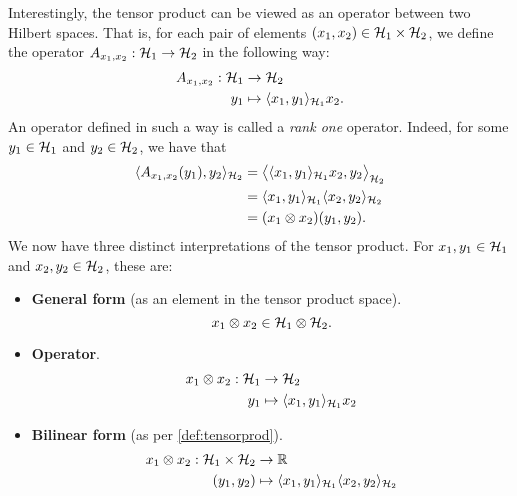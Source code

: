 Interestingly, the tensor product can be viewed as an operator between two Hilbert spaces.
That is, for each pair of elements $(x_1,x_2) \in {\mathcal H}_1\times{\mathcal H}_2$, we define the operator $A_{x_1,x_2}:{\mathcal H}_1\to{\mathcal H}_2$ in the following way:
\begin{align*}
  A_{x_1,x_2}:{\mathcal H}_1&\to{\mathcal H}_2 \\
  y_1&\mapsto \langle x_1,y_1\rangle_{{\mathcal H}_1}x_2.
\end{align*}
An operator defined in such a way is called a \emph{rank one} operator.
Indeed, for some $y_1\in{\mathcal H}_1$ and $y_2\in{\mathcal H}_2$, we have that
\begin{align*}
  \langle A_{x_1,x_2}(y_1),y_2\rangle_{{\mathcal H}_2} 
  &= \big\langle \langle x_1,y_1\rangle_{{\mathcal H}_1}x_2 , y_2 \big\rangle_{{\mathcal H}_2} \\
  &= \langle x_1,y_1\rangle_{{\mathcal H}_1}\langle x_2,y_2\rangle_{{\mathcal H}_2} \\
  &= (x_1\otimes x_2)(y_1,y_2).
\end{align*}
We now have three distinct interpretations of the tensor product.
For $x_1,y_1\in{\mathcal H}_1$ and $x_2,y_2\in{\mathcal H}_2$, these are:
\begin{itemize}
  \item \textbf{General form} (as an element in the tensor product space).
  \[
    x_1 \otimes x_2 \in {\mathcal H}_1 \otimes {\mathcal H}_2.
  \]
  \item \textbf{Operator}.
  \begin{align*}
    x_1 \otimes x_2:{\mathcal H}_1 &\to {\mathcal H}_2 \\
    y_1 &\mapsto \langle x_1,y_1\rangle_{{\mathcal H}_1}x_2
  \end{align*}  
  \item \textbf{Bilinear form} (as per \cref{def:tensorprod}). 
  \begin{align*}
    x_1 \otimes x_2:{\mathcal H}_1 \times {\mathcal H}_2 &\to \mathbb{R} \\
    (y_1,y_2) &\mapsto \langle x_1,y_1\rangle_{{\mathcal H}_1}\langle x_2,y_2\rangle_{{\mathcal H}_2}
  \end{align*}
\end{itemize}

